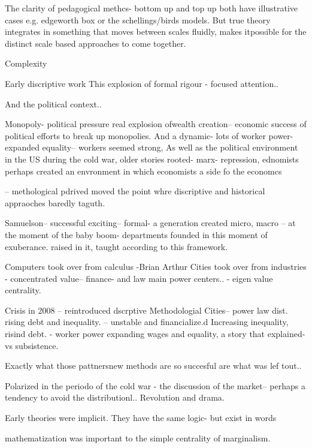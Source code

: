 The clarity of pedagogical methcs- bottom up and top up both have illustrative cases e.g. edgeworth box or the schellings/birds models.
But true theory integrates in something that moves between scales fluidly, makes itpossible for the distinct scale based approaches to come together.


Complexity

Early discriptive work
This explosion of formal rigour - focused attention.. 


And the political context..

Monopoly- political pressure real explosion ofwealth creation-- economic success of political efforts to break up monopolies.
And a dynamic- lots of worker power- expanded equality-- workers seemed strong, 
As well as the political environment in the US during the cold war, older stories rooted- marx- repression, ednomists perhaps created an envronment in which economists
a side fo the economcs

-- methological pdrived moved the point whre discriptive and historical appraoches baredly taguth.

Samuelson-- successful exciting-- formal-
a generation
created micro, macro
-- at the moment of the baby boom- departments founded in this moment of exuberance. raised in it, taught according to this framework.


Computers took over from calculus -Brian Arthur
Cities took over from industries - concentrated value-- finance- and law main power centers.. - eigen value centrality.

Crisis in 2008 -- reintroduced dscrptive
Methodologial
Cities-- power law dist. rising debt and inequality. -- unstable and financialize.d
Increasing inequality, risind debt. - worker power expanding wages and equality, a story that explained- vs subsistence.


Exactly what those pattnersnew methods are so succesful are what was lef tout..



Polarized in the periodo of the cold war - the discussion of the market-- perhaps a tendency to avoid the distributionl.. Revolution and drama.



Early theories were implicit. They have the same logic- but exist in words

mathematization was important to the simple centrality of marginalism.






